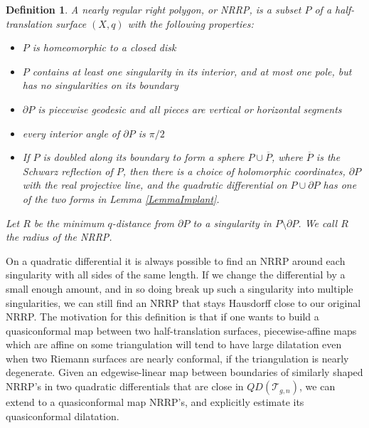 \documentclass[12pt]{article}
\newtheorem{definition}[theorem]{Definition}
\begin{document}
\begin{definition}\label{DefNRRP} A \emph{nearly regular right polygon}, or \emph{NRRP}, is a subset $P$ of a half-translation surface $(X,q)$ with the following properties:

\begin{itemize}
\item $P$ is homeomorphic to a closed disk
\item $P$ contains at least one singularity in its interior, and at most one pole, but has no singularities on its boundary
\item $\partial P$ is piecewise geodesic and all pieces are vertical or horizontal segments
\item every interior angle of $\partial P$ is $\pi/2$
\item If $P$ is doubled along its boundary to form a sphere $P \cup \overline{P}$, where $\overline{P}$ is the Schwarz reflection of $P$, then there is a choice of holomorphic coordinates, $\partial P$ with the real projective line, and the quadratic differential on $P \cup \partial P$ has one of the two forms in Lemma \ref{LemmaImplant}.
\end{itemize}

Let $R$ be the minimum $q$-distance from $\partial P$ to a singularity in $P \setminus \partial P$. We call $R$ the \emph{radius} of the NRRP.
\end{definition}

\noindent On a quadratic differential it is always possible to find an NRRP around each singularity with all sides of the same length. If we change the differential by a small enough amount, and in so doing break up such a singularity into multiple singularities, we can still find an NRRP that stays Hausdorff close to our original NRRP. The motivation for this definition is that if one wants to build a quasiconformal map between two half-translation surfaces, piecewise-affine maps which are affine on some triangulation will tend to have large dilatation even when two Riemann surfaces are nearly conformal, if the triangulation is nearly degenerate. Given an edgewise-linear map between boundaries of similarly shaped NRRP's in two quadratic differentials that are close in $QD(\mathcal{T}_{g,n})$, we can extend to a quasiconformal map NRRP's, and explicitly estimate its quasiconformal dilatation.
\end{document}
